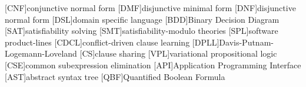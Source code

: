 \begin{acronym}[]
  [CNF]{conjunctive normal form}
  [DMF]{disjunctive minimal form}
  [DNF]{disjunctive normal form}
  [DSL]{domain specific language}
  [BDD]{Binary Decision Diagram}
  [SAT]{satisfiability solving}
  [SMT]{satisfiability-modulo theories}
  [SPL]{software product-lines}
  [CDCL]{conflict-driven clause learning}
  [DPLL]{Davis-Putnam-Logemann-Loveland}
  [CS]{clause sharing}
  [VPL]{variational propositional logic}
  [CSE]{common subexpression elimination}
  [API]{Application Programming Interface}
  [AST]{abstract syntax tree}
  [QBF]{Quantified Boolean Formula}
\end{acronym}